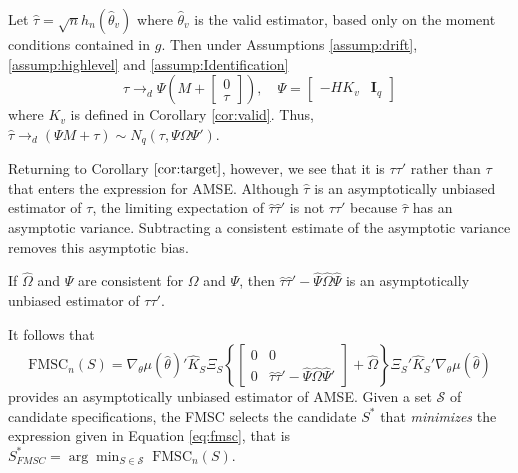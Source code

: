 \begin{thm} 
\label{thm:tau}
Let $\widehat{\tau} = \sqrt{n} h_n(\widehat{\theta}_v)$ where $\widehat{\theta}_v$ is the valid estimator, based only on the moment conditions contained in $g$. 
Then under Assumptions \ref{assump:drift}, \ref{assump:highlevel} and \ref{assump:Identification}
$$\widehat{\tau} \rightarrow_d \Psi\left( M + \left[\begin{array}
	{c} 0 \\ \tau
\end{array} \right]\right), \quad \Psi = \left[\begin{array}{cc} -HK_v & \mathbf{I}_q \end{array}\right]$$ 
where $K_v$ is defined in Corollary \ref{cor:valid}.
Thus, $\widehat{\tau}\rightarrow_d (\Psi M + \tau) \sim N_q(\tau, \Psi \Omega \Psi')$.
\end{thm}

Returning to Corollary $\ref{cor:target}$, however, we see that it is $\tau \tau'$ rather than $\tau$ that enters the expression for AMSE. 
Although $\widehat{\tau}$ is an asymptotically unbiased estimator of $\tau$, the limiting expectation of $\widehat{\tau} \widehat{\tau}'$ is not $\tau\tau'$ because $\widehat{\tau}$ has an asymptotic variance.  
Subtracting a consistent estimate of the asymptotic variance removes this asymptotic bias.

\begin{cor}
\label{cor:tautau}
If $\widehat{\Omega}$ and $\widehat{\Psi}$ are consistent for $\Omega$ and $\Psi$, then $ \widehat{\tau}\widehat{\tau}' - \widehat{\Psi}\widehat{\Omega}\widehat{\Psi}$ is an asymptotically unbiased estimator of $\tau\tau'$.
\end{cor}
It follows that
\begin{equation}
\label{eq:fmsc}
	\mbox{FMSC}_n(S) = \nabla_\theta\mu(\widehat{\theta})'\widehat{K}_S\Xi_S \left\{\left[\begin{array}{cc}0&0\\0&\widehat{\tau}\widehat{\tau}' - \widehat{\Psi}\widehat{\Omega}\widehat{\Psi}'\end{array}\right] + \widehat{\Omega}\right\}\Xi_S'\widehat{K}_S' \nabla_\theta\mu(\widehat{\theta})
\end{equation}
provides an asymptotically unbiased estimator of AMSE.
Given a set $\mathscr{S}$ of candidate specifications, the FMSC selects the candidate $S^*$ that \emph{minimizes} the expression given in Equation \ref{eq:fmsc}, that is $S^*_{FMSC} =  \arg \min_{S\in \mathscr{S}} \;\mbox{FMSC}_n(S)$.

